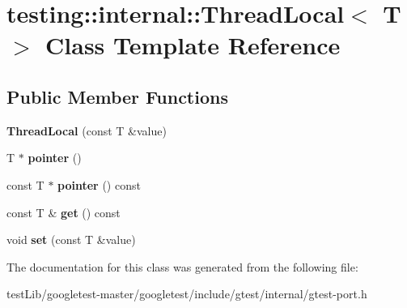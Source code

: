 \hypertarget{classtesting_1_1internal_1_1ThreadLocal}{}\section{testing\+:\+:internal\+:\+:Thread\+Local$<$ T $>$ Class Template Reference}
\label{classtesting_1_1internal_1_1ThreadLocal}
\subsection*{Public Member Functions}
\begin{DoxyCompactItemize}
\item 
\mbox{\label{classtesting_1_1internal_1_1ThreadLocal_a85610bdfdbc93a4c56215e0aad7da870}} 
{\bfseries Thread\+Local} (const T \&value)
\item 
\mbox{\label{classtesting_1_1internal_1_1ThreadLocal_a882f57fed4b074de83693c0c0fe62858}} 
T $\ast$ {\bfseries pointer} ()
\item 
\mbox{\label{classtesting_1_1internal_1_1ThreadLocal_a57e45bb60e3cd94abb04fa449e9f0367}} 
const T $\ast$ {\bfseries pointer} () const
\item 
\mbox{\label{classtesting_1_1internal_1_1ThreadLocal_ac56aeb97991824979bf192c63d1466f8}} 
const T \& {\bfseries get} () const
\item 
\mbox{\label{classtesting_1_1internal_1_1ThreadLocal_ab5ebc7ba07426cef7167afa2a7707eb4}} 
void {\bfseries set} (const T \&value)
\end{DoxyCompactItemize}


The documentation for this class was generated from the following file\+:\begin{DoxyCompactItemize}
\item 
test\+Lib/googletest-\/master/googletest/include/gtest/internal/gtest-\/port.\+h\end{DoxyCompactItemize}
